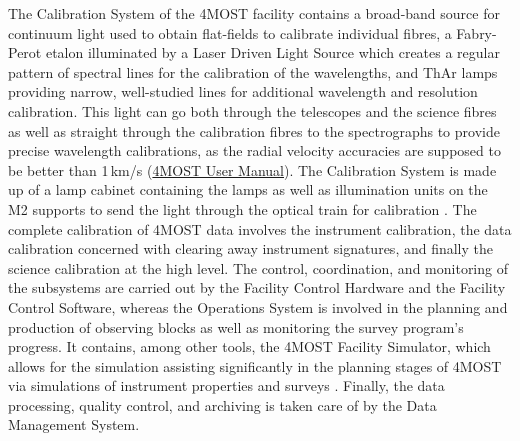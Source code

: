 \documentclass[a4paper,11pt]{article}
\begin{document}
%
The Calibration System of the 4MOST facility contains a broad-band source for continuum light used to obtain flat-fields to calibrate individual fibres, a Fabry-Perot etalon illuminated by a Laser Driven Light Source which creates a regular pattern of spectral lines for the calibration of the wavelengths, and ThAr lamps providing narrow, well-studied lines for additional wavelength and resolution calibration. This light can go both through the telescopes and the science fibres as well as straight through the calibration fibres to the spectrographs to provide precise wavelength calibrations, as the radial velocity accuracies are supposed to be better than 1\,km/s (\href{https://www.4most.eu/cms/files/VIS-MAN-4MOST-47110-9800-0001_2_00-4MOST-User-Manual.pdf}{4MOST User Manual}). The Calibration System is made up of a lamp cabinet containing the lamps as well as illumination units on the M2 supports to send the light through the optical train for calibration \citep{4most16}. The complete calibration of 4MOST data involves the instrument calibration, the data calibration concerned with clearing away instrument signatures, and finally the science calibration at the high level. The control, coordination, and monitoring of the subsystems are carried out by the Facility Control Hardware and the Facility Control Software, whereas the Operations System is involved in the planning and production of observing blocks as well as monitoring the survey program's progress. It contains, among other tools, the 4MOST Facility Simulator, which allows for the simulation assisting significantly in the planning stages of 4MOST via simulations of instrument properties and surveys \citep{dwelly16}. Finally, the data processing, quality control, and archiving is taken care of by the Data Management System.
%
\end{document}
